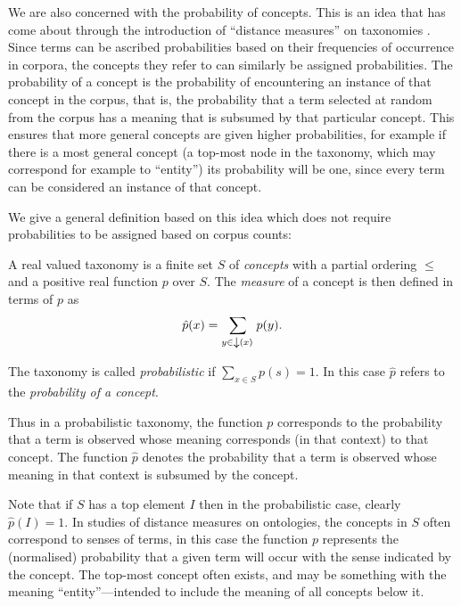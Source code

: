 We are also concerned with the probability of concepts. This is an idea that has come about through the introduction of ``distance measures'' on taxonomies \citep{Resnik:95}. Since terms can be ascribed probabilities based on their frequencies of occurrence in corpora, the concepts they refer to can similarly be assigned probabilities. The probability of a concept is the probability of encountering an instance of that concept in the corpus, that is, the probability that a term selected at random from the corpus has a meaning that is subsumed by that particular concept. This ensures that more general concepts are given higher probabilities, for example if there is a most general concept (a top-most node in the taxonomy, which may correspond for example to ``entity'') its probability will be one, since every term can be considered an instance of that concept.

We give a general definition based on this idea which does not require probabilities to be assigned based on corpus counts:
\begin{defn}
A real valued taxonomy is a finite set $S$ of \emph{concepts} with a partial ordering $\le$ and a positive real function $p$ over $S$. The \emph{measure} of a concept is then defined in terms of $p$ as
$$\hat{p}(x) = \sum_{y \in \left\downarrow(x)\right.} p(y).$$

The taxonomy is called \emph{probabilistic} if $\sum_{x \in S} p(s) = 1$. In this case $\hat{p}$ refers to the \emph{probability of a concept}.
\end{defn}
Thus in a probabilistic taxonomy, the function $p$ corresponds to the probability that a term is observed whose meaning corresponds (in that context) to that concept. The function $\hat{p}$ denotes the probability that a term is observed whose meaning in that context is subsumed by the concept.

Note that if $S$ has a top element $I$ then in the probabilistic case, clearly $\hat{p}(I) = 1$. In studies of distance measures on ontologies, the concepts in $S$ often correspond to senses of terms, in this case the function $p$ represents the (normalised) probability that a given term will occur with the sense indicated by the concept. The top-most concept often exists, and may be something with the meaning ``entity''---intended to include the meaning of all concepts below it.

